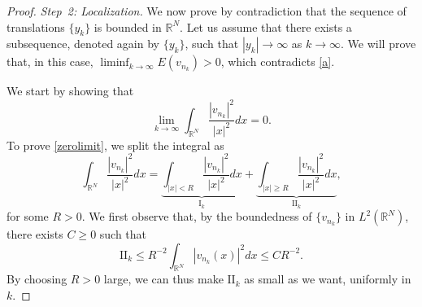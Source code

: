 \documentclass[reqno]{amsart}
\newcommand{\real}{\mathbb{R}}
\newcommand{\rn}{\real^N}
\newcommand{\intrn}{\int_{\real^N}}
\let\le=\leqslant
\let\ge= \geqslant
\theoremstyle{plain}
\theoremstyle{definition}
\numberwithin{equation}{section}
\begin{document}
\begin{proof}
\medskip
\noindent
{\em Step~2: Localization.}
We now prove by contradiction that the sequence of translations $\{y_k\}$ is bounded in $\rn$. 
Let us assume that there exists a subsequence, denoted again by $\{y_k\}$, 
such that $|y_k|\rightarrow\infty$ as $k\rightarrow\infty$.
We will prove that, in this case, $\liminf_{k\rightarrow\infty}E(v_{n_k})>0$, which contradicts \eqref{a}.

We start by showing that
\begin{equation}\label{zerolimit}
\lim_{k\to\infty} \intrn \frac{|v_{n_k}|^2}{|x|^2}dx = 0.
\end{equation}
To prove \eqref{zerolimit}, we split the integral as
\[
\intrn \frac{|v_{n_k}|^2}{|x|^2}dx =
\underbrace{\int_{|x|<R}\frac{|v_{n_k}|^2}{|x|^2}dx}_{\mathrm{I}_k}
+\underbrace{\int_{|x|\ge R}\frac{|v_{n_k}|^2}{|x|^2}dx}_{\mathrm{II}_k},
\]
for some $R>0$.
We first observe that, by the boundedness of $\{v_{n_k}\}$ in $L^2(\rn)$,
there exists $C\ge0$ such that
\[
\mathrm{II}_k\le R^{-2}\int_{\rn}|v_{n_k}(x)|^2dx\le CR^{-2}.
\] 
By choosing $R>0$ large, we can thus make $\mathrm{II}_k$ as small as we want, uniformly in $k$. 


\end{proof}
\end{document}
